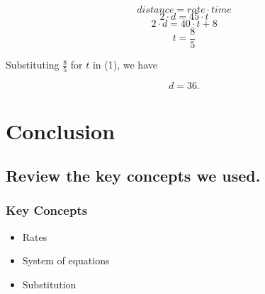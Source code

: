 \documentclass{beamer} %
\begin{document}
\setcounter{equation}{0}

\begin{frame}
\[
distance = rate \cdot time
\]
\begin{equation}
2\cdot d = 45\cdot t
\end{equation}
\begin{equation}
2\cdot d = 40\cdot t + 8
\end{equation}
\begin{equation}
t = \frac{8}{5}
\end{equation}

Substituting $\frac{8}{5}$ for $t$ in (1), we have

\[
d = \boxed{36}.
\]
\end{frame}

\section{Conclusion}

\subsection*{Review the key concepts we used.}

\begin{frame}
  \frametitle{Key Concepts}
  \pause
  \begin{itemize}
  \item Rates \pause
  \item System of equations \pause
  \item Substitution
  \end{itemize}
\end{frame}
\end{document}
